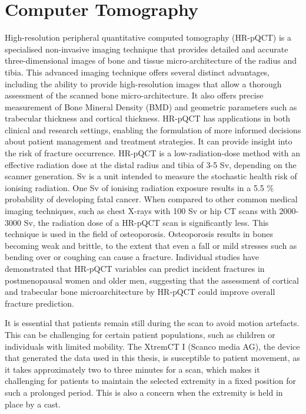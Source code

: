 \documentclass[
a4paper, 
12pt,
grayscalebody, %
abstract=on,
twoside, BCOR10mm, 12pt, DIV13,headinclude, footexclude, final, abstracton, openright
]{ibireprt}
\numberwithin{equation}{chapter}
\numberwithin{table}{chapter}
\numberwithin{figure}{chapter}
\numberwithin{algorithm}{chapter}
\numberwithin{example}{chapter}
\numberwithin{example}{chapter}
\begin{document}
\section{Computer Tomography}
High-resolution peripheral quantitative computed tomography (HR-pQCT) is a specialised non-invasive imaging technique that provides detailed and accurate three-dimensional images of bone and tissue micro-architecture of the radius and tibia. This advanced imaging technique offers several distinct advantages, including the ability to provide high-resolution images that allow a thorough assessment of the scanned bone micro-architecture. It also offers precise measurement of Bone Mineral Density (BMD) and geometric parameters such as trabecular thickness and cortical thickness. HR-pQCT has applications in both clinical and research settings, enabling the formulation of more informed decisions about patient management and treatment strategies. It can provide insight into the risk of fracture occurrence.
HR-pQCT is a low-radiation-dose method with an effective radiation dose at the distal radius and tibia of 3-5 \textmu Sv, depending on the scanner generation. Sv is a unit intended to measure the stochastic health risk of ionising radiation. One Sv of ionising radiation exposure results in a 5.5 \% probability of developing fatal cancer. When compared to other common medical imaging techniques, such as chest X-rays with 100 \textmu Sv or hip CT scans with 2000-3000 \textmu Sv, the radiation dose of a HR-pQCT scan is significantly less. This technique is used in the field of osteoporosis. Osteoporosis results in bones becoming weak and brittle, to the extent that even a fall or mild stresses such as bending over or coughing can cause a fracture. Individual studies have demonstrated that HR-pQCT variables can predict incident fractures in postmenopausal women and older men, suggesting that the assessment of cortical and trabecular bone microarchitecture by HR-pQCT could improve overall fracture prediction. 



It is essential that patients remain still during the scan to avoid motion artefacts. This can be challenging for certain patient populations, such as children or individuals with limited mobility. The XtremCT I (Scanco media AG), the device that generated the data used in this thesis, is susceptible to patient movement, as it takes approximately two to three minutes for a scan, which makes it challenging for patients to maintain the selected extremity in a fixed position for such a prolonged period. This is also a concern when the extremity is held in place by a cast.
\end{document}
